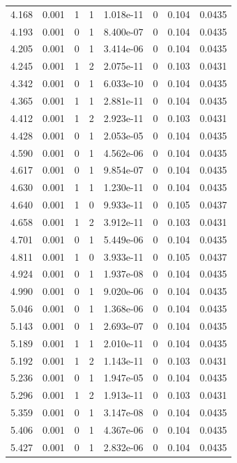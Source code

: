 \documentclass[preview]{standalone}
\begin{document}
{{{\begin{tabular}{L{1.2cm}C{1.2cm} C{0.3cm}C{0.5cm} C{1.4cm}C{1.4cm} C{1.4cm}C{1.4cm}}
  4.168  &  0.001  & 1     &  1 &  1.018e-11  & 0  & 0.104 &  0.0435   \\ 
  4.193  &  0.001  & 0     &  1 &  8.400e-07  & 0  & 0.104 &  0.0435   \\ 
  4.205  &  0.001  & 0     &  1 &  3.414e-06  & 0  & 0.104 &  0.0435   \\ 
  4.245  &  0.001  & 1     &  2 &  2.075e-11  & 0  & 0.103 &  0.0431   \\ 
  4.342  &  0.001  & 0     &  1 &  6.033e-10  & 0  & 0.104 &  0.0435   \\ 
  4.365  &  0.001  & 1     &  1 &  2.881e-11  & 0  & 0.104 &  0.0435   \\ 
  4.412  &  0.001  & 1     &  2 &  2.923e-11  & 0  & 0.103 &  0.0431   \\ 
  4.428  &  0.001  & 0     &  1 &  2.053e-05  & 0  & 0.104 &  0.0435   \\ 
  4.590  &  0.001  & 0     &  1 &  4.562e-06  & 0  & 0.104 &  0.0435   \\ 
  4.617  &  0.001  & 0     &  1 &  9.854e-07  & 0  & 0.104 &  0.0435   \\ 
  4.630  &  0.001  & 1     &  1 &  1.230e-11  & 0  & 0.104 &  0.0435   \\ 
  4.640  &  0.001  & 1     &  0 &  9.933e-11  & 0  & 0.105 &  0.0437   \\ 
  4.658  &  0.001  & 1     &  2 &  3.912e-11  & 0  & 0.103 &  0.0431   \\ 
  4.701  &  0.001  & 0     &  1 &  5.449e-06  & 0  & 0.104 &  0.0435   \\ 
  4.811  &  0.001  & 1     &  0 &  3.933e-11  & 0  & 0.105 &  0.0437   \\ 
  4.924  &  0.001  & 0     &  1 &  1.937e-08  & 0  & 0.104 &  0.0435   \\ 
  4.990  &  0.001  & 0     &  1 &  9.020e-06  & 0  & 0.104 &  0.0435   \\ 
  5.046  &  0.001  & 0     &  1 &  1.368e-06  & 0  & 0.104 &  0.0435   \\ 
  5.143  &  0.001  & 0     &  1 &  2.693e-07  & 0  & 0.104 &  0.0435   \\ 
  5.189  &  0.001  & 1     &  1 &  2.010e-11  & 0  & 0.104 &  0.0435   \\ 
  5.192  &  0.001  & 1     &  2 &  1.143e-11  & 0  & 0.103 &  0.0431   \\ 
  5.236  &  0.001  & 0     &  1 &  1.947e-05  & 0  & 0.104 &  0.0435   \\ 
  5.296  &  0.001  & 1     &  2 &  1.913e-11  & 0  & 0.103 &  0.0431   \\ 
  5.359  &  0.001  & 0     &  1 &  3.147e-08  & 0  & 0.104 &  0.0435   \\ 
  5.406  &  0.001  & 0     &  1 &  4.367e-06  & 0  & 0.104 &  0.0435   \\ 
  5.427  &  0.001  & 0     &  1 &  2.832e-06  & 0  & 0.104 &  0.0435   \\ 
\hline 
\end{tabular} 

}}}
\end{document}
